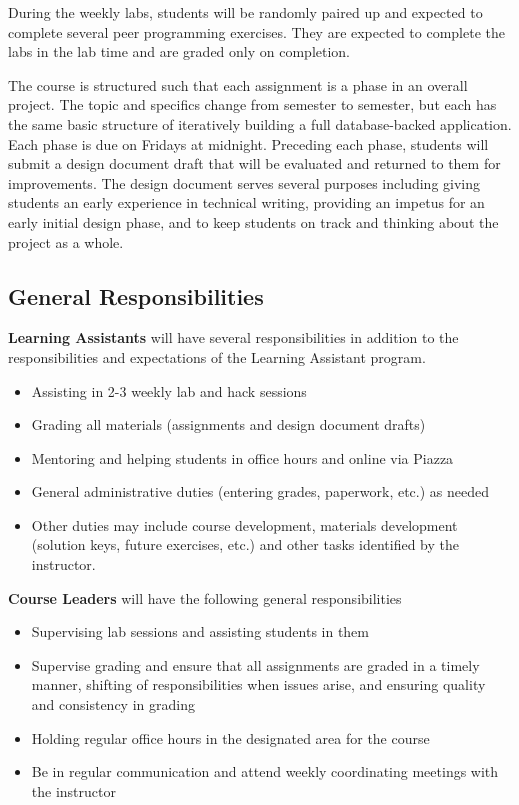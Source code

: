\documentclass[12pt]{scrartcl}
\begin{document}
During the weekly labs, students will be randomly paired up and 
expected to complete several peer programming exercises.  They are 
expected to complete the labs in the lab time and are graded only on 
completion.

The course is structured such that each assignment is a phase in an
overall project.  The topic and specifics change from semester to 
semester, but each has the same basic structure of iteratively
building a full database-backed application.  Each phase is due on
Fridays at midnight.  Preceding each phase, students will submit a
design document draft that will be evaluated and returned to them
for improvements.  The design document serves several purposes including
giving students an early experience in technical writing, providing
an impetus for an early initial design phase, and to keep students 
on track and thinking about the project as a whole.

\subsection*{General Responsibilities}

\textbf{Learning Assistants} will have several responsibilities in 
addition to the responsibilities and expectations of the Learning 
Assistant program.

\begin{itemize}
  \item Assisting in 2-3 weekly lab and hack sessions
  \item Grading all materials (assignments and design document drafts)
  \item Mentoring and helping students in office hours and online via Piazza
  \item General administrative duties (entering grades, paperwork, etc.) as needed
  \item Other duties may include course development, materials development 
  (solution keys, future exercises, etc.) and other tasks identified by the instructor.
\end{itemize}

\textbf{Course Leaders} will have the following general responsibilities
\begin{itemize}
  \item Supervising lab sessions and assisting students in them
  \item Supervise grading and ensure that all assignments are graded 
    in a timely manner, shifting of responsibilities when issues arise, 
    and ensuring quality and consistency in grading
  \item Holding regular office hours in the designated area for the course
  \item Be in regular communication and attend weekly coordinating meetings 
  with the instructor
\end{itemize}
\end{document}
